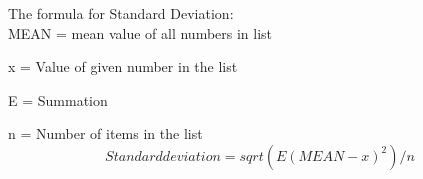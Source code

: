 \documentclass[12pt]{article}
\begin{document}
The formula for Standard Deviation:\\


MEAN = mean value of all numbers in list

x = Value of given number in the list

E = Summation

n = Number of items in the list\\

$$Standard deviation = sqrt(E(MEAN - x)^2)/n$$
\end{document}
